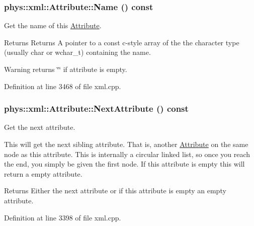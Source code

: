 \hypertarget{classphys_1_1xml_1_1Attribute_ab4c1186366d975d2086bf81df2ce1135}{
\subsubsection[{Name}]{\setlength{\rightskip}{0pt plus 5cm}phys::xml::Attribute::Name () const}}
\label{da/ddf/classphys_1_1xml_1_1Attribute_ab4c1186366d975d2086bf81df2ce1135}


Get the name of this \hyperlink{classphys_1_1xml_1_1Attribute}{Attribute}. 

\begin{DoxyReturn}{Returns}
Returns A pointer to a const c-\/style array of the the character type (usually char or wchar\_\-t) containing the name. 
\end{DoxyReturn}
\begin{DoxyWarning}{Warning}
returns \char`\"{}\char`\"{} if attribute is empty. 
\end{DoxyWarning}


Definition at line 3468 of file xml.cpp.

\hypertarget{classphys_1_1xml_1_1Attribute_a58faea36f12b6e57cc6d5891661c4ca9}{
\subsubsection[{NextAttribute}]{\setlength{\rightskip}{0pt plus 5cm}phys::xml::Attribute::NextAttribute () const}}
\label{da/ddf/classphys_1_1xml_1_1Attribute_a58faea36f12b6e57cc6d5891661c4ca9}


Get the next attribute. 

This will get the next sibling attribute. That is, another \hyperlink{classphys_1_1xml_1_1Attribute}{Attribute} on the same node as this attribute. This is internally a circular linked list, so once you reach the end, you simply be given the first node. If this attribute is empty this will return a empty attribute. \begin{DoxyReturn}{Returns}
Either the next attribute or if this attribute is empty an empty attribute. 
\end{DoxyReturn}


Definition at line 3398 of file xml.cpp.

